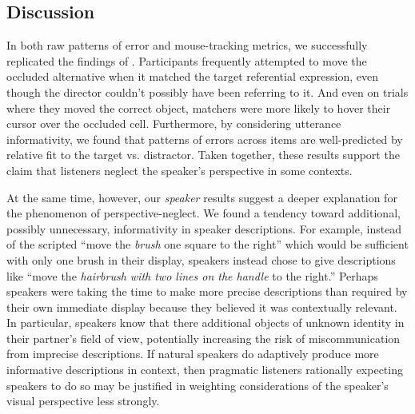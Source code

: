 \documentclass[manuscript]{stjour}
\begin{document}


\subsection{Discussion}

In both raw patterns of error and mouse-tracking metrics, we successfully replicated the findings of \cite{KeysarLinBarr03_LimitsOnTheoryOfMindUse}. Participants frequently attempted to move the occluded alternative when it matched the target referential expression, even though the director couldn't possibly have been referring to it. And even on trials where they moved the correct object, matchers were more likely to hover their cursor over the occluded cell. Furthermore, by considering utterance informativity, we found that patterns of errors across items are well-predicted by relative fit to the target vs. distractor. Taken together, these results support the claim that listeners neglect the speaker's perspective in some contexts. 

At the same time, however, our \emph{speaker} results suggest a deeper explanation for the phenomenon of perspective-neglect. We found a tendency toward additional, possibly unnecessary, informativity in speaker descriptions. For example, instead of the scripted ``move the \emph{brush} one square to the right'' which would be sufficient with only one brush in their display, speakers instead chose to give descriptions like ``move the \emph{hairbrush with two lines on the handle} to the right.'' 
Perhaps speakers were taking the time to make more precise descriptions than required by their own immediate display because they believed it was contextually relevant. 
In particular, speakers know that there additional objects of unknown identity in their partner's field of view, potentially increasing the risk of miscommunication from imprecise descriptions. 
If natural speakers do adaptively produce more informative descriptions in context, then pragmatic listeners rationally expecting speakers to do so may be justified in weighting considerations of the speaker's visual perspective less strongly. 
\end{document}
